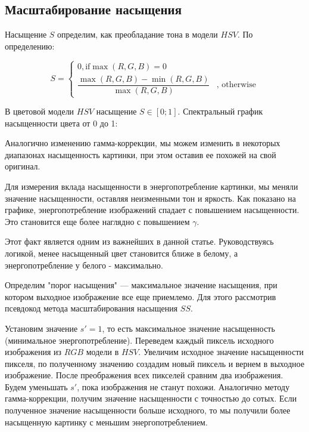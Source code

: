\documentclass[a4paper, 12pt]{article}
\begin{document}
\subsection*{Масштабирование насыщения}

    Насыщение $S$ определим, как преобладание тона в модели $HSV$. По определению:
    
    \begin{equation*}
     S = 
     \begin{cases}
       0, \text{if} \max{(R, G, B)} = 0\\
       \dfrac{\max{(R, G, B)} - \min{(R, G, B)}}{\max{(R, G, B)}} &\text{, otherwise}
     \end{cases}
    \end{equation*}
    
    В цветовой модели $HSV$ насыщение $S \in [0;1]$. Спектральный график насыщенности цвета от 0 до 1:
    
    Аналогично изменению гамма-коррекции, мы можем изменить в некоторых диапазонах насыщенность картинки, при этом оставив ее похожей на свой оригинал.
    
    Для измерения вклада насыщенности в энергопотребление картинки, мы меняли значение насыщенности, оставляя неизменными тон и яркость. Как показано на графике, энергопотребление изображений спадает с повышением насыщенности. Это становится еще более наглядно с повышением $\gamma$.
    
    Этот факт является одним из важнейших в данной статье. Руководствуясь логикой, менее насыщенный цвет становится ближе в белому, а энергопотребление у белого - максимально.
    
    Определим "порог насыщения" — максимальное значение насыщения, при котором выходное изображение все еще приемлемо. Для этого рассмотрив псевдокод метода масштабирования насыщения $SS$. 
    
    Установим значение $s' = 1$, то есть максимальное значение насыщенность (минимальное энергопотребление). Переведем каждый пиксель исходного изображения из $RGB$ модели в $HSV$. Увеличим исходное значение насыщенности пикселя, по полученному значению создадим новый пиксель и вернем в выходное изображение. После преображения всех пикселей сравним два изображения. Будем уменьшать $s'$, пока изображения не станут похожи. Аналогично методу гамма-коррекции, получим значение насыщенности с точностью до сотых. Если полученное значение насыщенности больше исходного, то мы получили более насыщенную картинку с меньшим энергопотреблением.    
    
\end{document}
